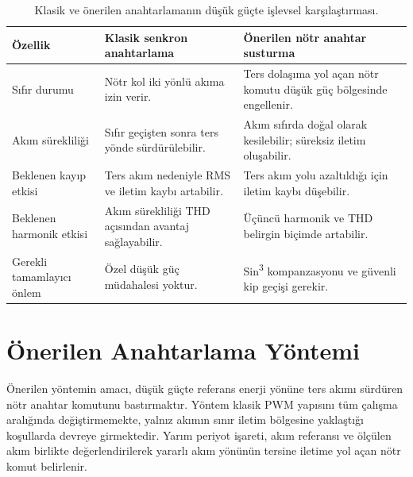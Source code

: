 \begin{table}[htbp]
  \centering
  \caption{Klasik ve önerilen anahtarlamanın düşük güçte işlevsel karşılaştırması.}
  \label{tab:klasik-onerilen-islevsel}
  \small
  \begin{tabularx}{\textwidth}{p{} X X}
    \toprule
    Özellik & Klasik senkron anahtarlama & Önerilen nötr anahtar susturma \\
    \midrule
    Sıfır durumu & Nötr kol iki yönlü akıma izin verir. & Ters dolaşıma yol açan nötr komutu düşük güç bölgesinde engellenir. \\
    Akım sürekliliği & Sıfır geçişten sonra ters yönde sürdürülebilir. & Akım sıfırda doğal olarak kesilebilir; süreksiz iletim oluşabilir. \\
    Beklenen kayıp etkisi & Ters akım nedeniyle RMS ve iletim kaybı artabilir. & Ters akım yolu azaltıldığı için iletim kaybı düşebilir. \\
    Beklenen harmonik etkisi & Akım sürekliliği THD açısından avantaj sağlayabilir. & Üçüncü harmonik ve THD belirgin biçimde artabilir. \\
    Gerekli tamamlayıcı önlem & Özel düşük güç müdahalesi yoktur. & Sin\textsuperscript{3} kompanzasyonu ve güvenli kip geçişi gerekir. \\
    \bottomrule
  \end{tabularx}
\end{table}

\section{Önerilen Anahtarlama Yöntemi}

Önerilen yöntemin amacı, düşük güçte referans enerji yönüne ters akımı sürdüren nötr anahtar komutunu bastırmaktır. Yöntem klasik PWM yapısını tüm çalışma aralığında değiştirmemekte, yalnız akımın sınır iletim bölgesine yaklaştığı koşullarda devreye girmektedir. Yarım periyot işareti, akım referansı ve ölçülen akım birlikte değerlendirilerek yararlı akım yönünün tersine iletime yol açan nötr komut belirlenir.

